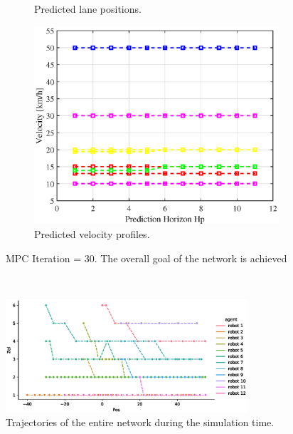 \begin{figure}[H]
\begin{subfigure}[b]{0.45\textwidth}
    \caption{Predicted lane positions.}
    \label{fig:second}
\end{subfigure}
\hfill
\begin{subfigure}[b]{0.45\textwidth}
    \includegraphics[width=\textwidth]{Kap6/no_restricted/no_restricted_vel30.eps}
    \caption{Predicted velocity profiles.}
    \label{fig:third}
\end{subfigure}
\caption{MPC Iteration = 30. The overall goal of the network is achieved }
\label{fig:figures}
\end{figure}

\\

\begin{figure}[H]
\centering
    \includegraphics[width=0.8\textwidth]{Kap6/no_restricted/no_restricted_trajectories.eps}
    \caption{Trajectories of the entire network during the simulation time.}
\end{figure}




